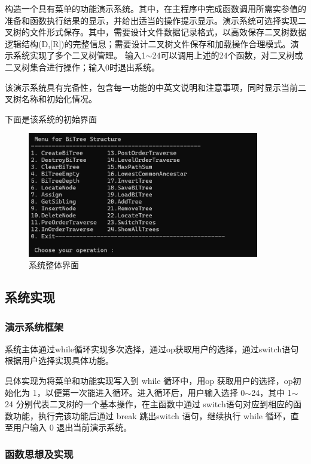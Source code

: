\documentclass[supercite]{Experimental_Report}
\newcommand{\whiteding}[1]{\ding{\numexpr171+#1\relax}}
\theoremstyle{definition}
\begin{document}
构造一个具有菜单的功能演示系统。其中，在主程序中完成函数调用所需实参值的准备和函数执行结果的显示，并给出适当的操作提示显示。演示系统可选择实现二叉树的文件形式保存。其中，\whiteding{1}需要设计文件数据记录格式，以高效保存二叉树数据逻辑结构(D,[R])的完整信息；\whiteding{2}需要设计二叉树文件保存和加载操作合理模式。演示系统实现了多个二叉树管理。
    输入1$\sim$24可以调用上述的24个函数，对二叉树或二叉树集合进行操作；输入0时退出系统。

该演示系统具有完备性，包含每一功能的中英文说明和注意事项，同时显示当前二叉树名称和初始化情况。

下面是该系统的初始界面

 \begin{figure}[H]
 	\centering
 	\includegraphics[width=0.9\textwidth]{images/二叉树系统界面.png}
 	\caption{系统整体界面}
 	\label{txlab}
 \end{figure}


\subsection{系统实现}

\subsubsection{演示系统框架}

系统主体通过while循环实现多次选择，通过op获取用户的选择，通过switch语句根据用户选择实现具体功能。

具体实现为将菜单和功能实现写入到 while 循环中，用op 获取用户的选择，op初始化为 1，以便第一次能进入循环。进入循环后，用户输入选择 0$\sim$24，其中 1$\sim$24 分别代表二叉树的一个基本操作，在主函数中通过 switch语句对应到相应的函数功能，执行完该功能后通过 break 跳出switch 语句，继续执行 while 循环，直至用户输入 0 退出当前演示系统。

\subsubsection{函数思想及实现}
\end{document}
